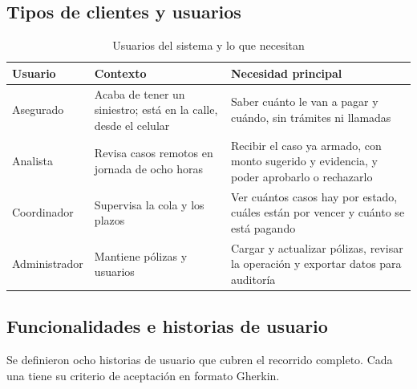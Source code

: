 \documentclass[12pt,letterpaper]{article}
\begin{document}
\subsection{Tipos de clientes y usuarios}

\begin{table}[H]
\centering
\caption{Usuarios del sistema y lo que necesitan}
\label{tab:usuarios}
\small
\begin{tabular}{p{2.6cm}p{4.2cm}p{6.6cm}}
\toprule
\textbf{Usuario} & \textbf{Contexto} & \textbf{Necesidad principal} \\
\midrule
Asegurado & Acaba de tener un siniestro; está en la calle, desde el celular &
Saber cuánto le van a pagar y cuándo, sin trámites ni llamadas \\
\addlinespace
Analista & Revisa casos remotos en jornada de ocho horas &
Recibir el caso ya armado, con monto sugerido y evidencia, y poder aprobarlo o rechazarlo \\
\addlinespace
Coordinador & Supervisa la cola y los plazos &
Ver cuántos casos hay por estado, cuáles están por vencer y cuánto se está pagando \\
\addlinespace
Administrador & Mantiene pólizas y usuarios &
Cargar y actualizar pólizas, revisar la operación y exportar datos para auditoría \\
\bottomrule
\end{tabular}
\end{table}

\subsection{Funcionalidades e historias de usuario}

Se definieron ocho historias de usuario que cubren el recorrido completo. Cada una tiene
su criterio de aceptación en formato Gherkin.
\end{document}
